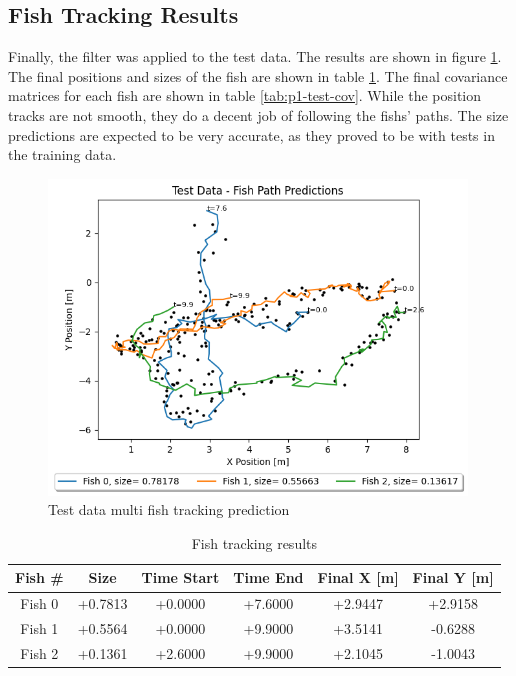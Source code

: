\documentclass[12pt]{article}
\begin{document}
\subsection{Fish Tracking Results}
Finally, the filter was applied to the test data. The results are shown in figure \ref{fig:p1-test-prediction}. The final positions and sizes of the fish are shown in table \ref{tab:p1-test-results}. The final covariance matrices for each fish are shown in table \ref{tab:p1-test-cov}. While the position tracks are not smooth, they do a decent job of following the fishs' paths. The size predictions are expected to be very accurate, as they proved to be with tests in the training data.

\begin{figure}[H]
    \centering
    \includegraphics[width=0.99\textwidth]{Problem 1/out/p1_test_paths.png}
    \caption{Test data multi fish tracking prediction}
    \label{fig:p1-test-prediction}
\end{figure}

\begin{table}[H]
    \centering
    \caption{Fish tracking results}
    \label{tab:p1-test-results}
    \begin{tabular}{|c|c|c|c|c|c|}
        \hline
        \textbf{Fish \#} & \textbf{Size} & \textbf{Time Start} & \textbf{Time End} & \textbf{Final X [m]} & \textbf{Final Y [m]}\\
        \hline
        Fish 0 & +0.7813 & +0.0000 & +7.6000 & +2.9447 & +2.9158\\
        Fish 1 & +0.5564 & +0.0000 & +9.9000 & +3.5141 & -0.6288\\
        Fish 2 & +0.1361 & +2.6000 & +9.9000 & +2.1045 & -1.0043\\
        \hline
    \end{tabular}
\end{table}
\end{document}
